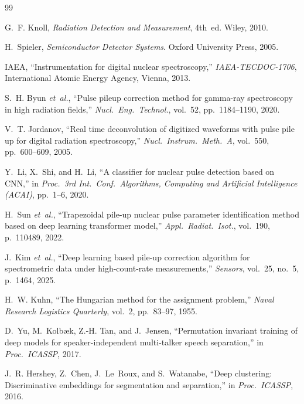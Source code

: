 \documentclass[11pt,twocolumn]{article}
\begin{document}
\begin{thebibliography}{99}

G.~F. Knoll, \emph{Radiation Detection and Measurement}, 4th~ed. Wiley, 2010.

H.~Spieler, \emph{Semiconductor Detector Systems}. Oxford University Press, 2005.

IAEA, ``Instrumentation for digital nuclear spectroscopy,'' \emph{IAEA-TECDOC-1706}, International Atomic Energy Agency, Vienna, 2013.

S.~H. Byun \emph{et~al.}, ``Pulse pileup correction method for gamma-ray spectroscopy in high radiation fields,'' \emph{Nucl.\ Eng.\ Technol.}, vol.~52, pp.~1184--1190, 2020.

V.~T. Jordanov, ``Real time deconvolution of digitized waveforms with pulse pile up for digital radiation spectroscopy,'' \emph{Nucl.\ Instrum.\ Meth.\ A}, vol.~550, pp.~600--609, 2005.

Y.~Li, X.~Shi, and H.~Li, ``A classifier for nuclear pulse detection based on CNN,'' in \emph{Proc.\ 3rd Int.\ Conf.\ Algorithms, Computing and Artificial Intelligence (ACAI)}, pp.~1--6, 2020.

H.~Sun \emph{et~al.}, ``Trapezoidal pile-up nuclear pulse parameter identification method based on deep learning transformer model,'' \emph{Appl.\ Radiat.\ Isot.}, vol.~190, p.~110489, 2022.

J.~Kim \emph{et~al.}, ``Deep learning based pile-up correction algorithm for spectrometric data under high-count-rate measurements,'' \emph{Sensors}, vol.~25, no.~5, p.~1464, 2025.

H.~W. Kuhn, ``The Hungarian method for the assignment problem,'' \emph{Naval Research Logistics Quarterly}, vol.~2, pp.~83--97, 1955.

D.~Yu, M.~Kolb\ae{}k, Z.-H. Tan, and J.~Jensen, ``Permutation invariant training of deep models for speaker-independent multi-talker speech separation,'' in \emph{Proc.\ ICASSP}, 2017.

J.~R. Hershey, Z.~Chen, J.~Le~Roux, and S.~Watanabe, ``Deep clustering: Discriminative embeddings for segmentation and separation,'' in \emph{Proc.\ ICASSP}, 2016.

\end{thebibliography}
\end{document}
